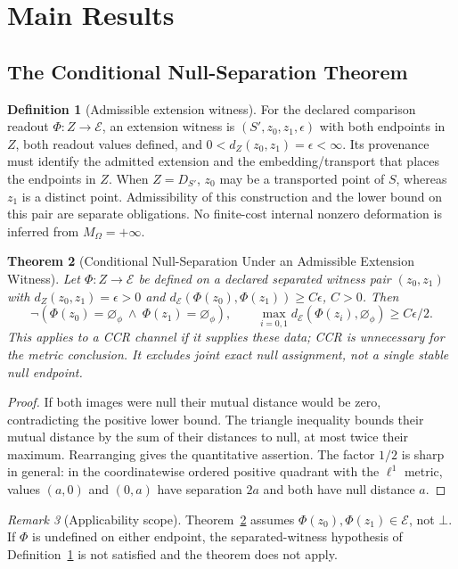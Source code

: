 \documentclass[11pt,a4paper]{article}
\theoremstyle{plain}
\newtheorem{theorem}{Theorem}[section]
\theoremstyle{definition}
\newtheorem{definition}[theorem]{Definition}
\theoremstyle{remark}
\newtheorem{remark}[theorem]{Remark}
\newcommand{\E}{\mathcal{E}}
\newcommand{\MO}{M_\Omega}
\newcommand{\dE}{d_{\mathcal{E}}}
\newcommand{\nullphi}{\varnothing_\phi}
\begin{document}
\section{Main Results}


\subsection{The Conditional Null-Separation Theorem}

\begin{definition}[Admissible extension witness]\label{def:extension-witness}
For the declared comparison readout $\Phi:Z\to\E$, an extension witness is $(S',z_0,z_1,\epsilon)$ with both endpoints in $Z$, both readout values defined, and $0<d_Z(z_0,z_1)=\epsilon<\infty$. Its provenance must identify the admitted extension and the embedding/transport that places the endpoints in $Z$. When $Z=D_{S'}$, $z_0$ may be a transported point of $S$, whereas $z_1$ is a distinct point. Admissibility of this construction and the lower bound on this pair are separate obligations. No finite-cost internal nonzero deformation is inferred from $\MO=+\infty$.
\end{definition}

\begin{theorem}[Conditional Null-Separation Under an Admissible Extension Witness]\label{thm:instability}
Let $\Phi:Z\to\E$ be defined on a declared separated witness pair $(z_0,z_1)$ with $d_Z(z_0,z_1)=\epsilon>0$ and $\dE(\Phi(z_0),\Phi(z_1))\geq C\epsilon$, $C>0$. Then
\[
\neg(\Phi(z_0)=\nullphi\ \wedge\ \Phi(z_1)=\nullphi),\qquad
\max_{i=0,1}\dE(\Phi(z_i),\nullphi)\geq C\epsilon/2.
\]
This applies to a CCR channel if it supplies these data; CCR is unnecessary for the metric conclusion. It excludes joint exact null assignment, not a single stable null endpoint.
\end{theorem}

\begin{proof}
If both images were null their mutual distance would be zero, contradicting the positive lower bound. The triangle inequality bounds their mutual distance by the sum of their distances to null, at most twice their maximum. Rearranging gives the quantitative assertion. The factor $1/2$ is sharp in general: in the coordinatewise ordered positive quadrant with the $\ell^1$ metric, values $(a,0)$ and $(0,a)$ have separation $2a$ and both have null distance $a$.
\end{proof}

\begin{remark}[Applicability scope]\label{rem:instability-scope}
Theorem~\ref{thm:instability} assumes $\Phi(z_0),\Phi(z_1)\in\E$, not $\bot$. If $\Phi$ is undefined on either endpoint, the separated-witness hypothesis of Definition~\ref{def:extension-witness} is not satisfied and the theorem does not apply.
\end{remark}
\end{document}
